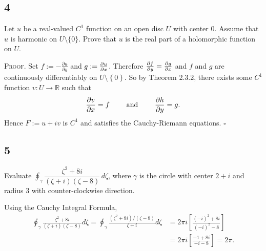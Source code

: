\documentclass[12pt]{article}
\newcounter{ProofCounter}
\newenvironment{Proof}{\stepcounter{ProofCounter}\textsc{Proof.}}{\hfill$\square$}
\begin{document}
\subsection*{4}
\begin{tcolorbox}
Let $u$ be a real-valued $C^1$ function on an open disc $U$ with center $0$. Assume that $u$ is harmonic on
$U\setminus\{0\}$. Prove that $u$ is the real part of a holomorphic
function on $U$.
\end{tcolorbox}
\begin{Proof}
Set $f := -\frac{\partial u}{\partial y}$ and $g := \frac{\partial u}{\partial x}$. Therefore $\frac{\partial f}{\partial y} = \frac{\partial g}{\partial x}$ and $f$ and $g$
are continuously differentiably on $U \setminus \left\{ 0 \right\}$. So by Theorem 2.3.2, there exists some $C^{1}$ function $v : U \rightarrow
\mathbb{R}$ such that 
\[ \frac{\partial v}{\partial x} = f \qquad \text{ and } \qquad \frac{\partial h}{\partial y} = g. \]
Hence $F := u + iv$ is $C^{1}$ and satisfies the Cauchy-Riemann equations.
\end{Proof}


\subsection*{5}
\begin{tcolorbox}
Evaluate
$\oint_\gamma \dfrac{\zeta^2+8i}{(\zeta+i)(\zeta-8)}\,d\zeta$,
where $\gamma$ is the circle with center $2+ i$ and radius $3$ with
counter-clockwise direction.
\end{tcolorbox}
Using the Cauchy Integral Formula,
\begin{align*}
\oint_{\gamma}\frac{\zeta^2 + 8i}{(\zeta + i)(\zeta - 8)}d\zeta = \oint_{\gamma} \frac{(\zeta^2 + 8i)/(\zeta - 8)}{\zeta + i}d\zeta & = 2\pi i
\left[ \frac{(-i)^2 + 8i}{(-i)^2 - 8} \right] \\
& = 2\pi i \left[ \frac{-1 + 8i}{-i - 8} \right] = 2\pi.
\end{align*}
\end{document}
